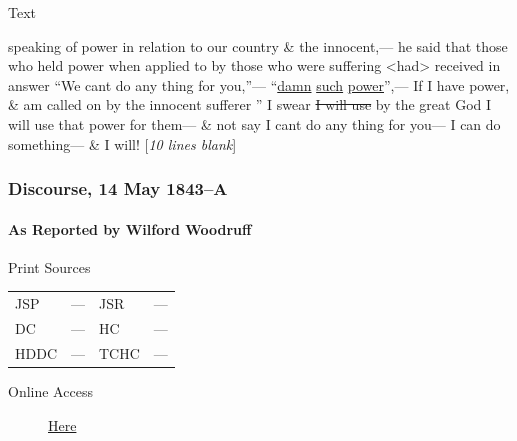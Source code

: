 				\begin{description}
					\item[Text]
				\end{description}
				
					speaking of power in relation to our country \& the innocent,--- he said that those who held power when applied to by those who were suffering <had> received in answer ``We cant do any thing for you,''--- ``\uline{damn} \uline{such} \uline{power}'',--- If I have power, \& am called on by the innocent sufferer '' I swear \sout{I will use} by the great God I will use that power for them--- \& not say I cant do any thing for you--- I can do something--- \& I will! [\textit{10 lines blank}]
					
		\subsubsection{Discourse, 14 May 1843--A}
			\label{EMS-1843-JS-14-MAY-1843-A}
			
			\paragraph{As Reported by Wilford Woodruff}
				\label{EMS-1843-JS-14-MAY-1843-A-WW}
			
				\begin{description}
					\item[Print Sources]
				\end{description}

					\begin{tabular}{p{0.5in}p{1in}p{0.5in}p{1in}}
					JSP	 	& ---		& JSR 		& --- \\
					DC	 	& ---		& HC 		& --- \\
					HDDC 	& ---		& TCHC 		& --- \\
					\end{tabular}
				
				\begin{description}
					\item[Online Access] \href{https://www.josephsmithpapers.org/paper-summary/discourse-14-may-1843-as-reported-by-wilford-woodruff/1}{Here}
				\end{description}
				
